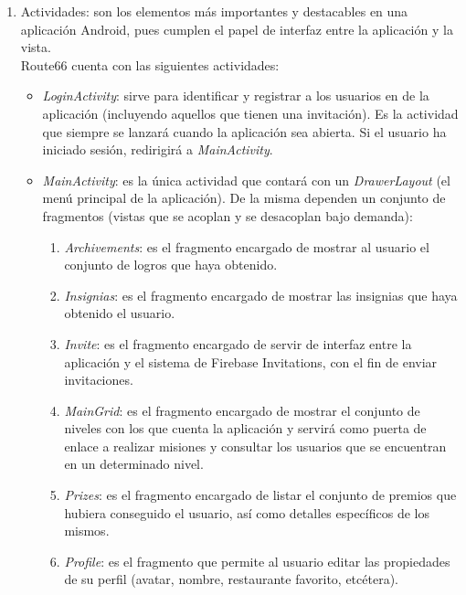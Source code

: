 \documentclass[twoside]{report}
\begin{document}
\begin{enumerate}
\item Actividades: son los elementos más importantes y destacables en una aplicación Android, pues cumplen el papel de interfaz entre la aplicación y la vista.\\
Route66 cuenta con las siguientes actividades:

	\begin{itemize}
	\item \textit{LoginActivity}: sirve para identificar y registrar a los usuarios en de la aplicación (incluyendo aquellos que tienen una invitación). Es la actividad que siempre se lanzará cuando la aplicación sea abierta. Si el usuario ha iniciado sesión, redirigirá  a \textit{MainActivity}.
	
	\item \textit{MainActivity}: es la única actividad que contará con un \textit{DrawerLayout} (el menú principal de la aplicación). De la misma dependen un conjunto de fragmentos (vistas que se acoplan y se desacoplan bajo demanda):
	
		\begin{enumerate}
			\item \textit{Archivements}: es el fragmento encargado de mostrar al usuario el conjunto de logros que haya obtenido.
			
			\item \textit{Insignias}: es el fragmento encargado de mostrar las insignias que haya obtenido el usuario.
			
			\item \textit{Invite}: es el fragmento encargado de servir de interfaz entre la aplicación y el sistema de Firebase Invitations, con el fin de enviar invitaciones.
			
			\item \textit{MainGrid}: es el fragmento encargado de mostrar el conjunto de niveles con los que cuenta la aplicación y servirá como puerta de enlace a realizar misiones y consultar los usuarios que se encuentran en un determinado nivel.
			
			\item \textit{Prizes}: es el fragmento encargado de listar el conjunto de premios que hubiera conseguido el usuario, así como detalles específicos de los mismos.
			
			\item \textit{Profile}: es el fragmento que permite al usuario editar las propiedades de su perfil (avatar, nombre, restaurante favorito, etcétera).
			

\end{enumerate}
\end{itemize}
\end{enumerate}
\end{document}
